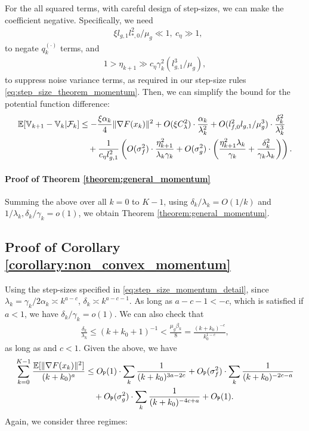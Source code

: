 For the all squared terms, with careful design of step-sizes, we can make the coefficient negative. Specifically, we need
\begin{align*}
    &\xi l_{g,1} l_{*,0}^2 / \mu_g \ll 1, \ c_\eta \gg 1,
\end{align*}
to negate $q_k^{(\cdot)}$ terms, and 
\begin{align*}
    1 > \eta_{k+1} \gg  c_{\eta} \gamma_k^2 (l_{g,1}^3/\mu_g),
\end{align*}
to suppress noise variance terms, as required in our step-size rules \eqref{eq:step_size_theorem_momentum}. Then, we can simplify the bound for the potential function difference:
\begin{align*}
    \mathbb{E}[\mathbb{V}_{k+1} - \mathbb{V}_k | \mathcal{F}_k] &\le -\frac{\xi \alpha_k}{4} \|\nabla F(x_k)\|^2 + O(\xi C_\lambda^2) \cdot \frac{\alpha_k}{\lambda_k^{2}} + O(l_{f,0}^2 l_{g,1}/\mu_g^3) \cdot \frac{\delta_k^2}{ \lambda_k^{3}} \\
    &\quad + \frac{1}{c_\eta l_{g,1}^2} \left( O(\sigma_f^2) \cdot \frac{\eta_{k+1}^2}{\lambda_k \gamma_k} + O(\sigma_g^2) \cdot \left( \frac{\eta_{k+1}^2 \lambda_k}{\gamma_k} + \frac{\delta_k^2}{\gamma_k \lambda_k} \right) \right).
\end{align*}


\paragraph{Proof of Theorem \ref{theorem:general_momentum}}
Summing the above over all $k = 0$ to $K-1$, using $\delta_k/ \lambda_k = O(1/k)$ and $1/\lambda_k, \delta_k / \gamma_k = o(1)$, we obtain Theorem \ref{theorem:general_momentum}. 




\subsection{Proof of Corollary \ref{corollary:non_convex_momentum}}
Using the step-sizes specified in \eqref{eq:step_size_momentum_detail}, since $\lambda_k = \gamma_k / 2\alpha_k \asymp k^{a-c}$, $\delta_k \asymp k^{a-c-1}$. As long as $a-c-1 < -c$, which is satisfied if $a < 1$, we have $\delta_k / \gamma_k = o(1)$. We can also check that 
\begin{align*}
    \frac{\delta_k}{\lambda_k} \le (k+k_0+1)^{-1} < \frac{\mu_g \beta_k}{8} = \frac{(k+k_0)^{-c}}{k_0^{1-c}},
\end{align*}
as long as and $c < 1$. Given the above, we have
\begin{align*}
    \sum_{k=0}^{K-1} \frac{\mathbb{E}[\|\nabla F(x_k)\|^2]}{(k+k_0)^{a}} &\le O_{\texttt{P}} (1) \cdot \sum_{k} \frac{1}{(k+k_0)^{3a-2c}} + O_{\texttt{P}}(\sigma_f^2) \cdot \sum_{k} \frac{1}{(k+k_0)^{-2c-a}} \nonumber \\
    &\quad + O_{\texttt{P}}(\sigma_g^2) \cdot \sum_{k} \frac{1}{(k+k_0)^{-4c+a}} + O_{\texttt{P}}(1). 
\end{align*}
Again, we consider three regimes:

